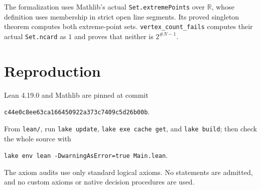 \documentclass[11pt]{article}
\begin{document}
The formalization uses Mathlib's actual \texttt{Set.extremePoints} over
$\mathbb R$, whose definition uses membership in strict open line segments.
Its proved singleton theorem computes both extreme-point sets.
\texttt{vertex\_count\_fails} computes their actual \texttt{Set.ncard}
as $1$ and proves that neither is $2^{\#N-1}$.

\section*{Reproduction}
Lean 4.19.0 and Mathlib are pinned at commit
\begin{center}\small\texttt{c44e0c8ee63ca166450922a373c7409c5d26b00b}.\end{center}
From \texttt{lean/}, run \texttt{lake update}, \texttt{lake exe cache get},
and \texttt{lake build}; then check the whole source with
\begin{center}\small\texttt{lake env lean -DwarningAsError=true Main.lean}.\end{center}
The axiom audits use only standard logical axioms. No statements are
admitted, and no custom axioms or native decision procedures are used.
\end{document}

